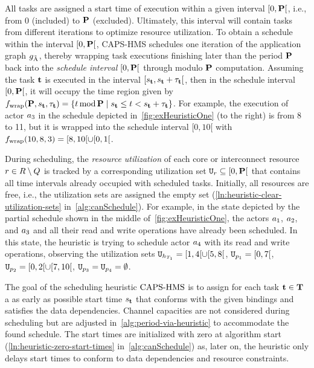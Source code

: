All tasks are assigned a start time of execution within a given interval $[0, \mathbf{P}[$, i.e., from 0 (included) to $\mathbf{P}$ (excluded).
Ultimately, this interval will contain tasks from different iterations to optimize resource utilization.
To obtain a schedule within the interval $[0, \mathbf{P}[$, \acs{CAPS-HMS} schedules one iteration of the application graph $g_{\tilde{\textrm{A}}}$, thereby wrapping task executions finishing later than the period $\mathbf{P}$ back into the \emph{schedule interval} $[0, \mathbf{P}[$ through modulo $\mathbf{P}$ computation.
Assuming the task $\mathbf{t}$ is executed in the interval $[s_{\mathbf{t}}, s_{\mathbf{t}} + \tau_{\mathbf{t}}[$, then in the schedule interval $[0, \mathbf{P}[$, it will occupy the time region given by $f_\mathrm{wrap}(\mathbf{P},s_{\mathbf{t}}, \tau_{\mathbf{t}}) = \{ t\operatorname{mod}\mathbf{P} \mid s_{\mathbf{t}} \leq t < s_{\mathbf{t}} + \tau_{\mathbf{t}} \}$.
For example, the execution of actor $a_3$ in the schedule depicted in~\cref{fig:exHeuristicOne} (to the right) is from 8 to 11, but it is wrapped into the schedule interval $[0, 10[$ with $f_\mathrm{wrap}(10,8,3) = [8, 10[ \cup [0, 1[$.
\par
During scheduling, the \emph{resource utilization} of each core or interconnect resource $r \in R \setminus Q$ is tracked by a corresponding utilization set $\mathtt{U}_r \subseteq [0,\mathbf{P}[$ that contains all time intervals already occupied with scheduled tasks.
Initially, all resources are free, i.e., the utilization sets are assigned the empty set (\cref{ln:heuristic-clear-utilization-sets} in~\cref{alg:canSchedule}).
For example, in the state depicted by the partial schedule shown in the middle of~\cref{fig:exHeuristicOne}, the actors $a_1$, $a_2$, and $a_3$ and all their read and write operations have already been scheduled.
In this state, the heuristic is trying to schedule actor $a_4$ with its read and write operations, observing the utilization sets $\mathtt{U}_{h_{T_{1}}} = [1,4[ \cup [5,8[$, $\mathtt{U}_{p_1} = [0,7[$, $\mathtt{U}_{p_2} = [0,2[ \cup [7,10[$, $\mathtt{U}_{p_3} = \mathtt{U}_{p_4} = \emptyset$.
\par
The goal of the scheduling heuristic $\textup{CAPS-HMS}$ is to assign for each task $\mathbf{t} \in \mathbf{T}$ a as early as possible start time $s_{\mathbf{t}}$ that conforms with the given bindings and satisfies the data dependencies.
Channel capacities are not considered during scheduling but are adjusted in~\cref{alg:period-via-heuristic} to accommodate the found schedule.
The start times are initialized with zero at algorithm start (\cref{ln:heuristic-zero-start-times} in~\cref{alg:canSchedule}) as, later on, the heuristic only delays start times to conform to data dependencies and resource constraints.
